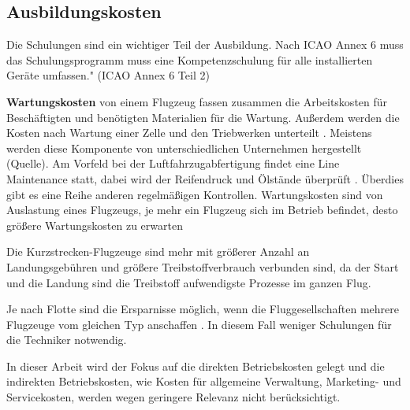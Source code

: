 \subsection{Ausbildungskosten}

Die Schulungen sind ein wichtiger Teil der Ausbildung. 
Nach ICAO Annex 6 muss das Schulungsprogramm muss eine Kompetenzschulung für alle installierten Geräte umfassen." (ICAO Annex 6 Teil 2)

\textbf{Wartungskosten} von einem Flugzeug fassen zusammen die Arbeitskosten für Beschäftigten und benötigten Materialien für die Wartung.
Außerdem werden die Kosten nach Wartung einer Zelle und den Triebwerken unterteilt \cite{wang2021research}. 
Meistens werden diese Komponente von unterschiedlichen
Unternehmen hergestellt (Quelle).
Am Vorfeld bei der Luftfahrzugabfertigung findet eine Line Maintenance statt, dabei wird der Reifendruck und Ölstände überprüft \cite{conrady2019luftverkehr}. 
Überdies gibt es eine Reihe anderen regelmäßigen Kontrollen.
Wartungskosten sind von Auslastung eines Flugzeugs, je mehr ein Flugzeug sich im Betrieb befindet, desto größere
Wartungskosten zu erwarten %

Die Kurzstrecken-Flugzeuge sind mehr mit größerer Anzahl an Landungsgebühren und größere Treibstoffverbrauch verbunden sind, da 
der Start und die Landung sind die Treibstoff aufwendigste Prozesse im ganzen Flug.

Je nach Flotte sind die Ersparnisse möglich, wenn die Fluggesellschaften mehrere Flugzeuge vom gleichen Typ anschaffen \cite{conrady2019luftverkehr}. 
In diesem Fall weniger Schulungen für die Techniker notwendig.


In dieser Arbeit wird der Fokus auf die direkten Betriebskosten gelegt und die indirekten Betriebskosten, wie Kosten für 
allgemeine Verwaltung, Marketing- und Servicekosten, werden wegen geringere Relevanz nicht berücksichtigt.



